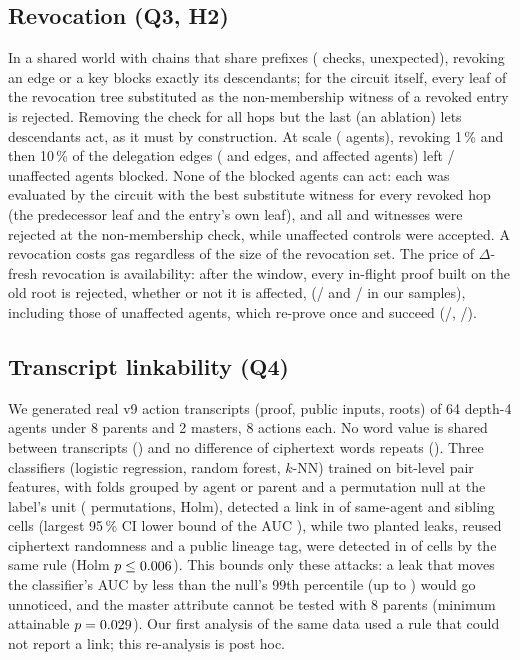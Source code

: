 \subsection{Revocation (Q3, H2)}
\label{subsec:eval-revocation}
In a shared world with chains that share prefixes (\NEthreeRows{} checks, \NEthreeUnexp{} unexpected), revoking an edge or a key blocks exactly its
descendants; for the circuit itself, every leaf of the revocation tree substituted as the non-membership witness of a revoked entry is rejected. Removing
the check for all hops but the last (an ablation) lets \NEthreeAblation{} descendants act, as it must by construction. At scale (\NWorldAgents{} agents), revoking 1\,\% and then 10\,\% of the delegation edges (\NRevOneEdges{} and \NRevTenEdges{} edges,
\NRevOneBlocked{} and \NRevTenBlocked{} affected agents) left \NRevOneCD{}/\NRevTenCD{} unaffected agents blocked. None of the \NBlockedAgents{} blocked agents can act: each was evaluated by the circuit
with the best substitute witness for every revoked hop (the predecessor leaf and the entry's own leaf), and all \NBlockedRejPred{} and \NBlockedRejOwn{}
witnesses were rejected at the non-membership check, while \NFreeControls{} unaffected controls were accepted. A revocation costs \NRevTenGas{} gas regardless of the size of the revocation set.
The price of $\Delta$-fresh revocation is availability: after the window, every in-flight proof built on the old root is rejected, whether or not it is affected,
(\NRevOneStale/\NRevSampleIn{} and \NRevTenStale/\NRevSampleIn{} in our samples), including those of unaffected agents, which re-prove once and succeed
(\NRevOneRebuilt/\NRevSampleRe, \NRevTenRebuilt/\NRevSampleRe).

\subsection{Transcript linkability (Q4)}
\label{subsec:eval-linkability}
We generated \NDetTranscripts{} real v9 action transcripts (proof, public inputs, roots) of 64 depth-4 agents under 8 parents and 2 masters, 8 actions each.
No word value is shared between transcripts (\NDetShared) and no difference of ciphertext words repeats (\NDetDiff). Three classifiers (logistic
regression, random forest, $k$-NN) trained on bit-level pair features, with folds grouped by agent or parent and a permutation null at the label's
unit (\NLinkPerms{} permutations, Holm), detected a link in \NLinkDetected{} of \NLinkCells{} same-agent and sibling cells (largest 95\,\% CI lower
bound of the AUC \NLinkMaxCiLo), while two planted leaks, reused ciphertext randomness and a public lineage tag, were detected in \NCtrlDetected{} of
\NCtrlCells{} cells by the same rule (Holm $p\le0.006$). This bounds only these attacks: a leak that moves the classifier's AUC by less than the null's
99th percentile (up to \NLinkNullQninetynine) would go unnoticed, and the master attribute cannot be tested with 8 parents (minimum attainable
$p=0.029$). Our first analysis of the same data used a rule that could not report a link; this re-analysis is post hoc.

